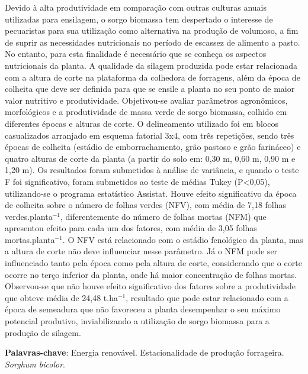 \documentclass[article,12pt,onesidea,4paper,english,brazil]{abntex2}
\begin{document}
	\noindent Devido à alta produtividade em comparação com outras culturas anuais utilizadas
	para ensilagem, o sorgo biomassa tem despertado o interesse de pecuaristas para
	sua utilização como alternativa na produção de volumoso, a fim de suprir as
	necessidades nutricionais no período de escassez de alimento a pasto. No entanto,
	para esta finalidade é necessário que se conheça os aspectos nutricionais da planta.
	A qualidade da silagem produzida pode estar relacionada com a altura de corte na
	plataforma da colhedora de forragens, além da época de colheita que deve ser
	definida para que se ensile a planta no seu ponto de maior valor nutritivo e
	produtividade. Objetivou-se avaliar parâmetros agronômicos, morfológicos e a
	produtividade de massa verde de sorgo biomassa, colhido em diferentes épocas e
	alturas de corte. O delineamento utilizado foi em blocos casualizados arranjado em
	esquema fatorial 3x4, com três repetições, sendo três épocas de colheita (estádio de
	emborrachamento, grão pastoso e grão farináceo) e quatro alturas de corte da
	planta (a partir do solo em: 0,30 m, 0,60 m, 0,90 m e 1,20 m). Os resultados foram
	submetidos à análise de variância, e quando o teste F foi significativo, foram
	submetidos ao teste de médias Tukey (P<0,05), utilizando-se o programa estatístico
	Assistat. Houve efeito significativo da época de colheita sobre o número de folhas
	verdes (NFV), com média de 7,18 folhas verdes.planta$^{-1}$, diferentemente do número
	de folhas mortas (NFM) que apresentou efeito para cada um dos fatores, com média
	de 3,05 folhas mortas.planta$^{-1}$. O NFV está relacionado com o estádio fenológico da planta, mas a altura de corte não deve influenciar nesse parâmetro. Já o NFM pode ser influenciado tanto pela época como pela altura de corte, considerando que o corte ocorre no terço inferior da planta, onde há maior concentração de folhas mortas. Observou-se que não houve efeito significativo dos fatores sobre a
	produtividade que obteve média de 24,48 t.ha$^{-1}$, resultado que pode estar
	relacionado com a época de semeadura que não favoreceu a planta desempenhar o
	seu máximo potencial produtivo, inviabilizando a utilização de sorgo biomassa para
	a produção de silagem.
	
	\vspace{\onelineskip}
	
	\noindent
	\textbf{Palavras-chave}: Energia renovável. Estacionalidade de produção forrageira.
	\textit{Sorghum bicolor}.	
	
\end{document}
